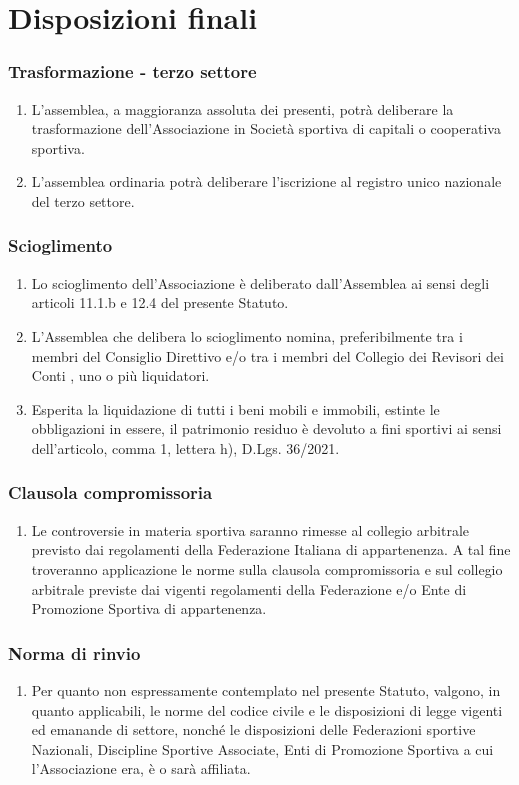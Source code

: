 \documentclass{djtsdoc}
\begin{document}
	\part{Disposizioni finali}
	\section{Trasformazione - terzo settore}
	\begin{enumerate}
		\item L'assemblea, a maggioranza assoluta dei presenti, potrà deliberare la trasformazione dell'Associazione in Società sportiva di capitali o cooperativa sportiva.
		\item L'assemblea ordinaria potrà deliberare l'iscrizione al registro unico nazionale del terzo settore.
	\end{enumerate}
	
	\section{Scioglimento}
	\begin{enumerate}
		\item Lo scioglimento dell'Associazione è deliberato dall'Assemblea ai sensi degli articoli 11.1.b e 12.4 del presente Statuto.
		\item L'Assemblea che delibera lo scioglimento nomina, preferibilmente tra i membri del  Consiglio Direttivo e/o  tra i membri del Collegio dei Revisori dei Conti , uno o più liquidatori.
		\item Esperita la liquidazione di tutti i beni mobili e immobili, estinte le obbligazioni in essere, il patrimonio residuo è devoluto a fini sportivi ai sensi dell'articolo, comma 1, lettera h), D.Lgs. 36/2021.
	\end{enumerate}
	
	\section{Clausola compromissoria}
	\begin{enumerate}
		\item Le controversie in materia sportiva saranno rimesse al collegio arbitrale previsto dai regolamenti della Federazione Italiana di appartenenza. A tal fine troveranno applicazione le norme sulla clausola compromissoria e sul collegio arbitrale previste dai vigenti regolamenti della Federazione e/o Ente di Promozione Sportiva di appartenenza.
	\end{enumerate}
	
	\section{Norma di rinvio}
	\begin{enumerate}
		\item Per quanto non espressamente contemplato nel presente Statuto, valgono, in quanto applicabili, le norme del codice civile e le disposizioni di legge vigenti ed emanande di settore, nonché le disposizioni delle Federazioni sportive Nazionali, Discipline Sportive Associate, Enti di Promozione Sportiva a cui l'Associazione era, è o sarà affiliata.
	\end{enumerate}
	
\end{document}
